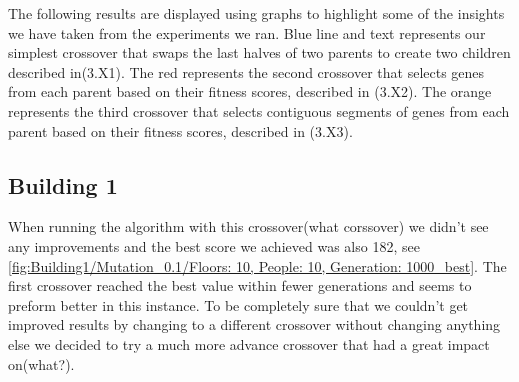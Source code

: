 






The following results are displayed using graphs to highlight some of the insights we have taken from the experiments we ran. Blue line and text represents our simplest crossover that swaps the last halves of two parents to create two children described in(3.X1). The red represents the second crossover that selects genes from each parent based on their fitness scores, described in (3.X2). The orange represents the third crossover that selects contiguous segments of genes from each parent based on their fitness scores, described in (3.X3).

\subsection{Building 1}
When running the algorithm with this crossover(what corssover) we didn't see any improvements and the best score we achieved was also 182, see \ref{fig:Building1/Mutation_0.1/Floors: 10, People: 10, Generation: 1000_best}. The first crossover reached the best value within fewer generations and seems to preform better in this instance. To be completely sure that we couldn't get improved results by changing to a different crossover without changing anything else we decided to try a much more advance crossover that had a great impact on(what?). %


